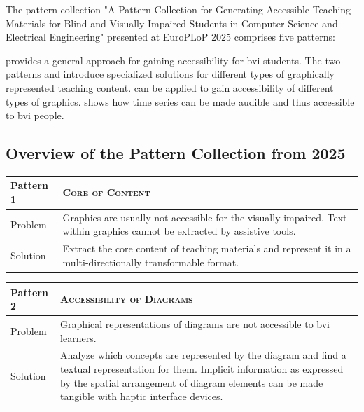 The pattern collection "A Pattern Collection for Generating Accessible Teaching Materials for Blind and Visually Impaired Students in Computer Science and Electrical Engineering" presented at EuroPLoP 2025 comprises five patterns:

\patternOneInline provides a general approach for gaining accessibility for \ac{bvi} students. 
The two patterns \patternTwoInline and \patternThreeInline introduce specialized solutions for different types of graphically represented teaching content. 
\patternFiveInline can be applied to gain accessibility of different types of graphics. 
\patternFourInline shows how time series can be made audible and thus accessible to \ac{bvi} people.

\newpage
\subsection*{Overview of the Pattern Collection from 2025}
\vspace{-2em}
\begin{table}[!ht]
    \centering
    \begin{tabularx}{\textwidth}{|p{}|X|}
    \hline
         Pattern 1 &  \textsc{Core of Content}  \\ \hline
         Problem & Graphics are usually not accessible for the visually impaired.  Text within graphics cannot be extracted by assistive tools.  \\ \hline
         Solution & Extract the core content of teaching materials and represent it in a multi-directionally transformable format.  \\ \hline
    \end{tabularx}
\end{table}
\vspace{-3em}
\begin{table}[!ht]
    \centering
\begin{tabularx}{\textwidth}{|p{}|X|}
    \hline
         Pattern 2 & \textsc{Accessibility of Diagrams}  \\ \hline
         Problem &  Graphical representations of diagrams are not accessible to \ac{bvi} learners. \\ \hline
         Solution &  Analyze which concepts are represented by the diagram and find a textual representation for them. 
Implicit information as expressed by the spatial arrangement of diagram elements can be made tangible with haptic interface devices.  \\ \hline
\end{tabularx}
\end{table}
